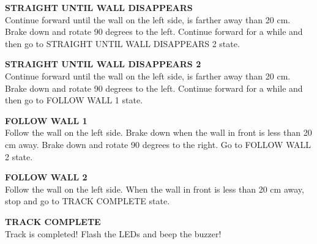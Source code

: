 \begin{itemize}
	\begin{item}
		\textbf{STRAIGHT UNTIL WALL DISAPPEARS} \\ Continue forward until the wall on the left side, is farther away than 20 cm. Brake down and rotate 90 degrees to the left. Continue forward for a while and then go to STRAIGHT UNTIL WALL DISAPPEARS 2 state.
	\end{item}

	\begin{item}
		\textbf{STRAIGHT UNTIL WALL DISAPPEARS 2} \\ Continue forward until the wall on the left side, is farther away than 20 cm. Brake down and rotate 90 degrees to the left. Continue forward for a while and then go to FOLLOW WALL 1 state.
	\end{item}

	\begin{item}
		\textbf{FOLLOW WALL 1} \\ Follow the wall on the left side. Brake down when the wall in front is less than 20 cm away. Brake down and rotate 90 degrees to the right. Go to FOLLOW WALL 2 state.
	\end{item}

	\begin{item}
		\textbf{FOLLOW WALL 2} \\ Follow the wall on the left side. When the wall in front is less than 20 cm away, stop and go to TRACK COMPLETE state.
	\end{item}

	\begin{item}
		\textbf{TRACK COMPLETE} \\ Track is completed! Flash the LEDs and beep the buzzer!
	\end{item}

\end{itemize}



